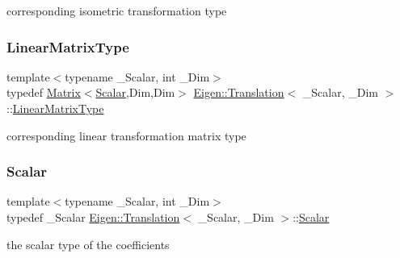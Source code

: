 corresponding isometric transformation type \mbox{\label{class_eigen_1_1_translation_ac5aca3bc67564e96ad550aba971de8b6}} 
\subsubsection{\texorpdfstring{LinearMatrixType}{LinearMatrixType}}
{\footnotesize\ttfamily template$<$typename \+\_\+\+Scalar, int \+\_\+\+Dim$>$ \\
typedef \mbox{\hyperlink{class_eigen_1_1_matrix}{Matrix}}$<$\mbox{\hyperlink{class_eigen_1_1_translation_ad596bf21ced4b902cc242205df486e21}{Scalar}},Dim,Dim$>$ \mbox{\hyperlink{class_eigen_1_1_translation}{Eigen\+::\+Translation}}$<$ \+\_\+\+Scalar, \+\_\+\+Dim $>$\+::\mbox{\hyperlink{class_eigen_1_1_translation_ac5aca3bc67564e96ad550aba971de8b6}{Linear\+Matrix\+Type}}}

corresponding linear transformation matrix type \mbox{\label{class_eigen_1_1_translation_ad596bf21ced4b902cc242205df486e21}} 
\subsubsection{\texorpdfstring{Scalar}{Scalar}}
{\footnotesize\ttfamily template$<$typename \+\_\+\+Scalar, int \+\_\+\+Dim$>$ \\
typedef \+\_\+\+Scalar \mbox{\hyperlink{class_eigen_1_1_translation}{Eigen\+::\+Translation}}$<$ \+\_\+\+Scalar, \+\_\+\+Dim $>$\+::\mbox{\hyperlink{class_eigen_1_1_translation_ad596bf21ced4b902cc242205df486e21}{Scalar}}}

the scalar type of the coefficients \mbox{\label{class_eigen_1_1_translation_a339e17dfec5394ae563f62cca0df451f}} 
